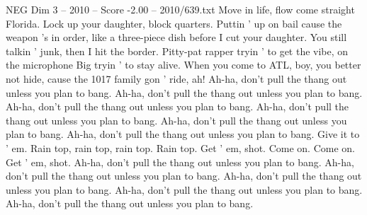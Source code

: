 \begin{textsample}{NEG Dim 3 – 2010 – Score -2.00 – 2010/639.txt}
Move in life, flow come straight Florida.
Lock up your daughter, block quarters.
Puttin ' up on bail cause the weapon 's in order, like a three-piece dish before I cut your daughter.
You still talkin ' junk, then I hit the border.
Pitty-pat rapper tryin ' to get the vibe, on the microphone Big tryin ' to stay alive.
When you come to ATL, boy, you better not hide, cause the 1017 family gon ' ride, ah!
Ah-ha, don't pull the thang out unless you plan to bang.
Ah-ha, don't pull the thang out unless you plan to bang.
Ah-ha, don't pull the thang out unless you plan to bang.
Ah-ha, don't pull the thang out unless you plan to bang.
Ah-ha, don't pull the thang out unless you plan to bang.
Ah-ha, don't pull the thang out unless you plan to bang.
Give it to ' em.
Rain top, rain top, rain top.
Rain top.
Get ' em, shot.
Come on.
Come on.
Get ' em, shot.
Ah-ha, don't pull the thang out unless you plan to bang.
Ah-ha, don't pull the thang out unless you plan to bang.
Ah-ha, don't pull the thang out unless you plan to bang.
Ah-ha, don't pull the thang out unless you plan to bang.
Ah-ha, don't pull the thang out unless you plan to bang.

\end{textsample}
